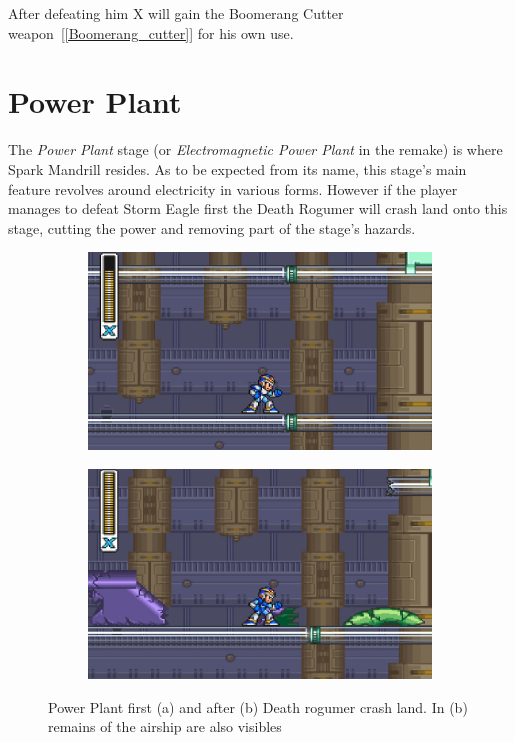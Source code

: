 After defeating him X will gain the Boomerang Cutter weapon~[\ref{Boomerang_cutter}] for his own use.

\section{Power Plant}
The \textit{Power Plant} stage (or \textit{Electromagnetic Power Plant} in the remake) is where Spark Mandrill resides. As to be expected from its name, this stage's main feature revolves around electricity in various forms. However if the player manages to defeat Storm Eagle first the Death Rogumer will crash land onto this stage, cutting the power and removing part of the stage's hazards.
\begin{figure}[htp]
	\centering
	\begin{subfigure}{0.42\linewidth}
		\centering
		\includegraphics[width=\linewidth]{figures/X1/Spark_mandrill/Mandrill_power.jpg}
		\caption{}
	\end{subfigure}
	\begin{subfigure}{0.4\linewidth}
		\centering
		\includegraphics[width=\linewidth]{figures/X1/Spark_mandrill/Mandrill_no_power.jpg}
		\caption{}
	\end{subfigure}
	\caption{Power Plant first (a) and after (b) Death rogumer crash land. In (b) remains of the airship are also visibles}
\end{figure}

